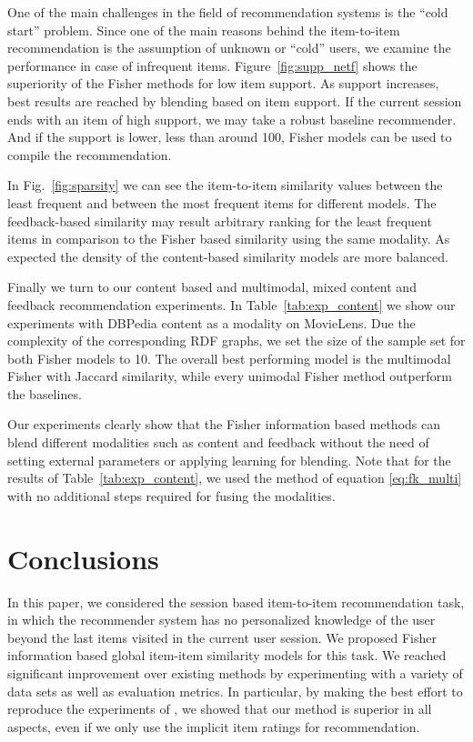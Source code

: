 \documentclass[preprint]{sig-alternate-05-2015}
\begin{document}
One of the main challenges in the field of recommendation systems is the ``cold start'' problem. Since one of the main reasons behind the item-to-item 
recommendation is the assumption of unknown or ``cold'' users, we examine the performance in case of infrequent items. Figure~\ref{fig:supp_netf} shows the superiority of the Fisher methods for
low item support.  As support increases, best results are reached by blending based on item support.  If the current session ends with an item of high support, we may take a robust baseline recommender.  And if the support is lower, less than around 100, Fisher models can be used to compile the recommendation.

In Fig.~\ref{fig:sparsity} we can see the item-to-item similarity values between the least frequent and between the most frequent items for different models. The feedback-based similarity may result arbitrary 
ranking for the least frequent items in comparison to the Fisher based similarity using the same modality. As expected the density of the content-based similarity models are more balanced. 

Finally we turn to our content based and multimodal, mixed content and feedback recommendation experiments.
In Table~\ref{tab:exp_content} we show our experiments with DBPedia content as a modality on MovieLens. Due the complexity of the corresponding RDF graphs, we set the size of the sample set for both Fisher models to 10. 
The overall best performing model is the multimodal Fisher with Jaccard similarity, while every unimodal Fisher method outperform the baselines. 

Our experiments clearly show that the Fisher information based methods can blend different modalities such as content and feedback without the need of setting external parameters or applying learning for blending.  Note that for the results of Table~\ref{tab:exp_content}, we used the method of equation \eqref{eq:fk_multi} with no additional steps required for fusing the modalities.

\section{Conclusions}

In this paper, we considered the session based item-to-item recommendation task, in which the recommender system has no personalized knowledge of the user beyond the last items visited in the current user session.
We proposed Fisher information based global item-item similarity models for this task.
We reached significant improvement over existing methods by experimenting with a variety of data sets as well as evaluation metrics. In particular, by making the best effort to 
reproduce the experiments of \cite{koenigstein2013towards}, we showed that our method is superior in all aspects, even if we only use the implicit item ratings for recommendation.
\end{document}
